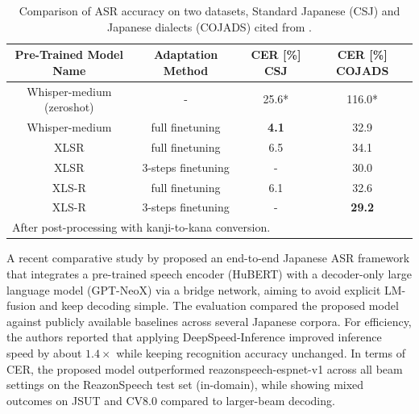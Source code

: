 \begin{table}[H]
    \centering
    \caption{Comparison of ASR accuracy on two datasets, Standard Japanese (CSJ) and Japanese dialects (COJADS) cited from \cite{takahashi2024comparison}.}
    \begin{tabular}{c|c|c|c}
    \hline
    \textbf{Pre-Trained Model Name} & \textbf{Adaptation Method} & \textbf{CER [\%] CSJ} & \textbf{CER [\%] COJADS} \\ \hline
    Whisper-medium (zeroshot)       & -                              & 25.6*                 & 116.0*                   \\ \hline
    Whisper-medium                  & full finetuning                & \textbf{4.1}          & 32.9                     \\ \hline
    XLSR                            & full finetuning                & 6.5                   & 34.1                     \\ \hline
    XLSR                            & 3-steps finetuning             & -                     & 30.0                     \\ \hline
    XLS-R                           & full finetuning                & 6.1                   & 32.6                     \\ \hline
    XLS-R                           & 3-steps finetuning             & -                     & \textbf{29.2}            \\ \hline
    \multicolumn{4}{l}{\footnotesize *After post-processing with kanji-to-kana conversion.} \\
    \end{tabular}
    \label{tab:asr_comparison}
\end{table}


A recent comparative study by \textcite{hono2024integratingpretrainedspeechlanguage} proposed an end-to-end Japanese ASR framework that integrates a pre-trained speech encoder (HuBERT) with a decoder-only large language model (GPT-NeoX) via a bridge network, aiming to avoid explicit LM-fusion and keep decoding simple. The evaluation compared the proposed model against publicly available baselines across several Japanese corpora. For efficiency, the authors reported that applying DeepSpeed-Inference improved inference speed by about $1.4\times$ while keeping recognition accuracy unchanged. In terms of CER, the proposed model outperformed reazonspeech-espnet-v1 across all beam settings on the ReazonSpeech test set (in-domain), while showing mixed outcomes on JSUT and CV8.0 compared to larger-beam decoding.

